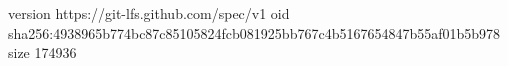 version https://git-lfs.github.com/spec/v1
oid sha256:4938965b774bc87c85105824fcb081925bb767c4b5167654847b55af01b5b978
size 174936
